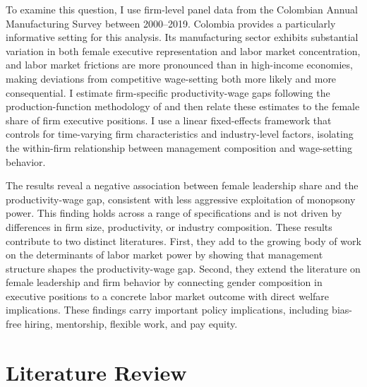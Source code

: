 \documentclass[12pt]{article}
\begin{document}
To examine this question, I use firm-level panel data from the Colombian Annual Manufacturing Survey between 2000--2019. Colombia provides a particularly informative setting for this analysis. Its manufacturing sector exhibits substantial variation in both female executive representation and labor market concentration, and labor market frictions are more pronounced than in high-income economies, making deviations from competitive wage-setting both more likely and more consequential\textcite{alviarez_markets_2025}. I estimate firm-specific productivity-wage gaps following the production-function methodology of \textcite{yeh_monopsony_2022} and then relate these estimates to the female share of firm executive positions. I use a linear fixed-effects framework that controls for time-varying firm characteristics and industry-level factors, isolating the within-firm relationship between management composition and wage-setting behavior.

The results reveal a negative association between female leadership share and the productivity-wage gap, consistent with less aggressive exploitation of monopsony power. This finding holds across a range of specifications and is not driven by differences in firm size, productivity, or industry composition. These results contribute to two distinct literatures. First, they add to the growing body of work on the determinants of labor market power by showing that management structure shapes the productivity-wage gap. Second, they extend the literature on female leadership and firm behavior by connecting gender composition in executive positions to a concrete labor market outcome with direct welfare implications. These findings carry important policy implications, including bias-free hiring, mentorship, flexible work, and pay equity.

\section{Literature Review}\label{sec:literature}
\end{document}

